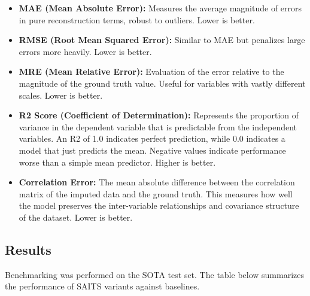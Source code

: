 \begin{itemize}
    \item \textbf{MAE (Mean Absolute Error):} Measures the average magnitude of errors in pure reconstruction terms, robust to outliers. Lower is better.
    \item \textbf{RMSE (Root Mean Squared Error):} Similar to MAE but penalizes large errors more heavily. Lower is better.
    \item \textbf{MRE (Mean Relative Error):} Evaluation of the error relative to the magnitude of the ground truth value. Useful for variables with vastly different scales. Lower is better.
    \item \textbf{R2 Score (Coefficient of Determination):} Represents the proportion of variance in the dependent variable that is predictable from the independent variables. An R2 of 1.0 indicates perfect prediction, while 0.0 indicates a model that just predicts the mean. Negative values indicate performance worse than a simple mean predictor. Higher is better.
    \item \textbf{Correlation Error:} The mean absolute difference between the correlation matrix of the imputed data and the ground truth. This measures how well the model preserves the inter-variable relationships and covariance structure of the dataset. Lower is better.
\end{itemize}

\subsection{Results}
Benchmarking was performed on the SOTA test set. The table below summarizes the performance of SAITS variants against baselines.

